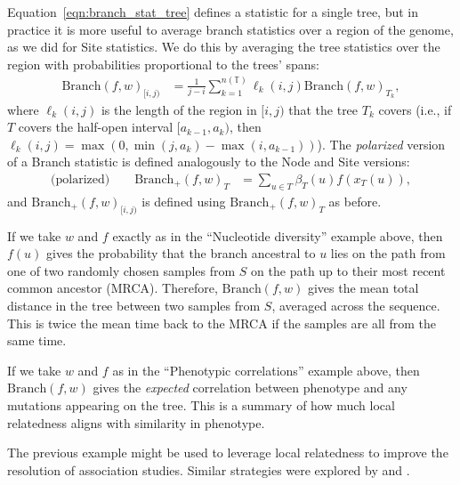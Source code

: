 \documentclass{article}
\newcommand{\branch}{\mbox{Branch}} %
\newcommand{\branchp}{\mbox{Branch}_+} %
\newcommand{\treeseq}{\mathbb{T}} %
\newcommand{\iw}{w} %
\newcommand{\nw}{x} %
\begin{document}
Equation~\eqref{eqn:branch_stat_tree} defines a statistic for a single tree,
but in practice it is more useful to average branch statistics
over a region of the genome, as we did for Site statistics.
We do this by averaging the tree statistics over the region
with probabilities proportional to the trees' spans:
\begin{align}
    \branch(f, \iw)_{[i,j)}
    &=
    \frac{1}{j-i} \sum_{k=1}^{n(\treeseq)} \ell_k(i,j) \branch(f, \iw)_{T_k} ,
\end{align}
where $\ell_k(i,j)$ is the length of the region in $[i,j)$ that the tree $T_k$ covers
(i.e., if $T$ covers the half-open interval $[a_{k-1},a_k)$,
then $\ell_k(i,j) = \max(0, \min(j,a_k) - \max(i,a_{k-1}))$).
The \emph{polarized} version of a Branch statistic
is defined analogously to the Node and Site versions:
\begin{align} \label{eqn:branch_polarised}
    \text{(polarized)} \qquad
    \branchp(f, \iw)_T
    &=
    \sum_{u \in T} \beta_T(u) f(\nw_{T}(u)) ,
\end{align}
and $\branchp(f, \iw)_{[i,j)}$ is defined using $\branchp(f, \iw)_T$ as before.

\begin{example} \label{ex:branch_diversity}
    If we take $\iw$ and $f$ exactly as in the ``Nucleotide diversity'' example above,
    then $f(u)$ gives the probability that the branch ancestral to $u$
    lies on the path from one of two randomly chosen samples from $S$
    on the path up to their most recent common ancestor (MRCA).
    Therefore, $\branch(f, \iw)$
    gives the mean total distance in the tree between two samples from $S$,
    averaged across the sequence.
    This is twice the mean time back to the MRCA if the samples are all from the same time.
\end{example}

\begin{example} \label{ex:branch_correlation}
    If we take $\iw$ and $f$ as in the ``Phenotypic correlations'' example above,
    then $\branch(f, \iw)$ gives the \emph{expected} correlation between phenotype and any mutations
    appearing on the tree. This is a summary of how much local relatedness
    aligns with similarity in phenotype.
\end{example}

The previous example might be used to leverage local relatedness
to improve the resolution of association studies.
Similar strategies were explored by \citet{zollner2005coalescent} and \citet{minichiello2006mapping}.
\end{document}

